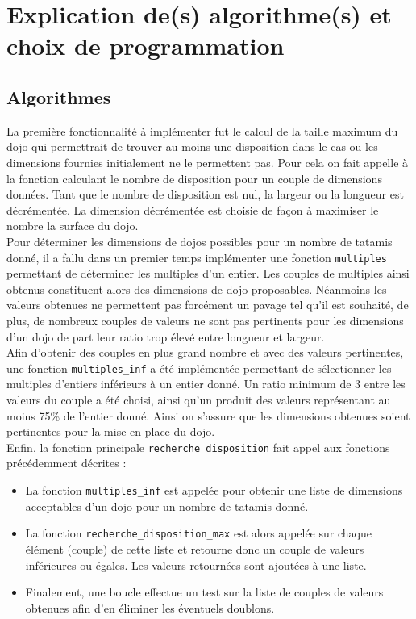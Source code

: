 \section{Explication de(s) algorithme(s) et choix de programmation}

\subsection{Algorithmes}

La première fonctionnalité à implémenter fut le calcul de la taille maximum du dojo qui permettrait de trouver au moins une disposition 
dans le cas ou les dimensions fournies initialement ne le permettent pas. Pour cela on fait appelle à la fonction calculant le nombre 
de disposition pour un couple de dimensions données. Tant que le nombre de disposition est nul, la largeur ou la longueur est décrémentée. 
La dimension décrémentée est choisie de façon à maximiser le nombre la surface du dojo.\\

Pour déterminer les dimensions de dojos possibles pour un nombre de tatamis donné, il a fallu dans un premier temps implémenter 
une fonction \texttt{multiples} permettant de déterminer les multiples d’un entier. Les couples de multiples ainsi obtenus constituent alors des dimensions 
de dojo proposables. Néanmoins les valeurs obtenues ne permettent pas forcément un pavage tel qu’il est souhaité, de plus, de nombreux 
couples de valeurs ne sont pas pertinents pour les dimensions d’un dojo de part leur ratio trop élevé entre longueur et largeur.\\

Afin d’obtenir des couples en plus grand nombre et avec des valeurs pertinentes, une fonction \texttt{multiples\_inf} a été implémentée permettant de sélectionner 
les multiples d’entiers inférieurs à un entier donné.  Un ratio minimum de 3 entre les valeurs du couple a été choisi, ainsi qu’un produit 
des valeurs représentant au moins 75\% de l’entier donné. Ainsi on s’assure que les dimensions obtenues soient pertinentes pour la mise en 
place du dojo.\\

Enfin, la fonction principale \texttt{recherche\_disposition} fait appel aux fonctions précédemment décrites :
\begin{itemize}
    \item La fonction \texttt{multiples\_inf} est appelée pour obtenir une liste de dimensions acceptables d’un dojo pour un nombre de tatamis donné.
    \item La fonction \texttt{recherche\_disposition\_max} est alors appelée sur chaque élément (couple) de cette liste et retourne donc un couple de 
    valeurs inférieures ou égales. Les valeurs retournées sont ajoutées à une liste.
    \item Finalement, une boucle effectue un test sur la liste de couples de valeurs obtenues afin d’en éliminer les éventuels doublons.
\end{itemize}

